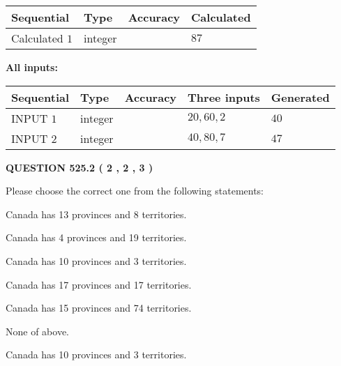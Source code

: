 \documentclass[12pt]{article}
\begin{document}
   
  
  
\noindent\begin{tabular}{|l|l|l|l|}
\hline
 Sequential & Type & Accuracy & Calculated \\ 
\hline
 
 
  Calculated $  1 $ & integer &  & 
  $ 87 $ 
 \\  \hline  
 \end{tabular}
   
   
   
   
\noindent\vspace{0.1in}\hspace{-0.08in} {\textbf{\Large{All inputs: }}}
   
   
  
  
\noindent\begin{tabular}{|l|l|l|l|l|}
\hline
 Sequential & Type & Accuracy & Three inputs & Generated \\ 
\hline
 
 
  INPUT $  1 $ & integer &  & $
 20
 , 
 60
 , 
 2
 $ & $ 40 $ 
 \\  \hline  
 
 
  INPUT $  2 $ & integer &  & $
 40
 , 
 80
 , 
 7
 $ & $ 47 $ 
 \\  \hline  
 \end{tabular}
   
   
  
\vspace{0.2in}
  
{\textbf{\Large{QUESTION
525.2 
 ( 2 , 2 , 3 )
}}}
  
  
Please choose the correct one from the following statements:
 
 
Canada has  13 provinces and  8 territories.
 
 
Canada has   4 provinces and  19 territories.
 
 
Canada has 10  provinces and 3 territories.
 
 
Canada has  17 provinces and  17 territories.
 
 
Canada has  15 provinces and  74 territories.
 
 
 None of above.
 
 
\noindent{}
 
 
Canada has 10  provinces and 3 territories.
 
\end{document}
